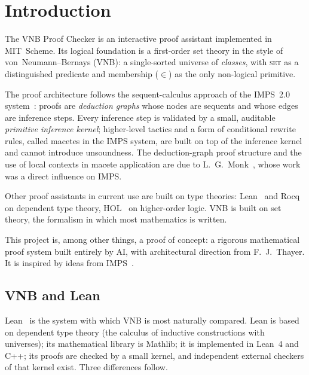 \chapter{Introduction}
\label{ch:intro}

\begin{sloppypar}The VNB Proof Checker is an interactive proof assistant implemented in
MIT~Scheme.  Its logical foundation is a first-order set theory in the
style of von~Neumann--Bernays (VNB): a single-sorted universe of
\emph{classes}, with \textsc{set} as a distinguished predicate and
membership ($\in$) as the only non-logical primitive.\end{sloppypar}

The proof architecture follows the sequent-calculus approach of the
IMPS~2.0 system~\cite{IMPS}: proofs are \emph{deduction graphs} whose
nodes are sequents and whose edges are inference steps.  Every
inference step is validated by a small, auditable \emph{primitive
inference kernel}; higher-level tactics and a form of conditional
rewrite rules, called macetes in the IMPS system, are built on top of
the inference kernel and cannot introduce unsoundness.
The deduction-graph proof structure and the use of local contexts in
macete application are due to L.~G.~Monk~\cite{Monk1988}, whose work
was a direct influence on IMPS.

Other proof assistants in current use are built on type theories:
Lean~\cite{Lean} and Rocq~\cite{Rocq} on dependent type theory,
HOL~\cite{HOL} on higher-order logic.  VNB is built on set theory, the
formalism in which most mathematics is written.

This project is, among other things, a proof of concept: a rigorous
mathematical proof system built entirely by AI,
with architectural direction from F.~J.~Thayer.  It is inspired by
ideas from IMPS~\cite{IMPS}.

\section{VNB and Lean}
\label{sec:vnb-lean}

Lean~\cite{Lean} is the system with which VNB is most naturally compared.
Lean is based on dependent type theory (the calculus of inductive
constructions with universes); its mathematical library is Mathlib; it is
implemented in Lean~4 and C++; its proofs are checked by a small kernel,
and independent external checkers of that kernel exist.  Three differences
follow.

